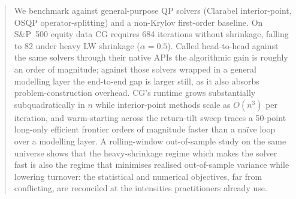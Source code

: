 \begin{abstract}
We benchmark against general-purpose QP solvers (Clarabel interior-point, OSQP operator-splitting) and a non-Krylov
first-order baseline. On S\&P~500 equity data CG requires 684 iterations without
shrinkage, falling to 82 under heavy LW shrinkage ($\alpha=0.5$). Called head-to-head
against the same solvers through their native APIs the algorithmic gain is roughly
an order of magnitude; against those solvers wrapped in a general modelling layer the
end-to-end gap is larger still, as it also absorbs problem-construction overhead.
CG's runtime grows substantially subquadratically in $n$ while
interior-point methods scale as $O(n^3)$ per iteration, and warm-starting across the
return-tilt sweep traces a 50-point long-only efficient frontier orders of magnitude
faster than a na\"{i}ve loop over a modelling layer.
A rolling-window out-of-sample study on the same universe shows that the heavy-shrinkage
regime which makes the solver fast is also the regime that minimises realised
out-of-sample variance while lowering turnover: the statistical and numerical objectives, far from
conflicting, are reconciled at the intensities practitioners already use.
\end{abstract}
